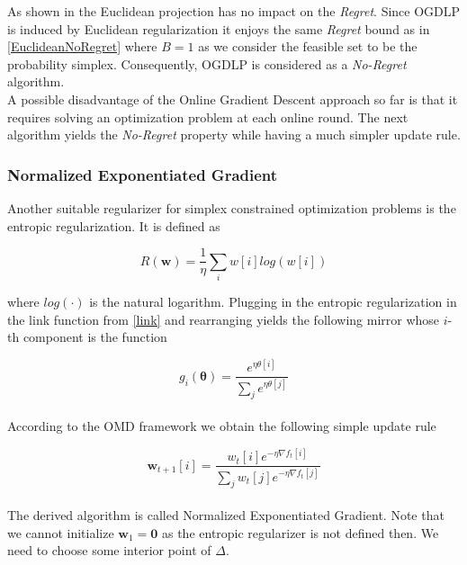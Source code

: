 As shown in \cite[Cor. 2.17]{shalev} the Euclidean projection has no impact on the \textit{Regret}. Since OGDLP is induced by Euclidean regularization it enjoys the same \textit{Regret} bound as in \ref{EuclideanNoRegret} where $B = 1$ as we consider the feasible set to be the probability simplex. Consequently, OGDLP is considered as a \textit{No-Regret} algorithm. \\

A possible disadvantage of the Online Gradient Descent approach so far is that it requires solving an optimization problem at each online round. The next algorithm yields the \textit{No-Regret} property while having a much simpler update rule.


\subsubsection{Normalized Exponentiated Gradient}\label{subsubsection:normalizedExponentiatedGradient}

Another suitable regularizer for simplex constrained optimization problems is the entropic regularization. It is defined as 

\begin{equation}\label{entropicReg}
    R(\textbf{w}) = \frac{1}{\eta} \sum_{i}w[i]log(w[i])
\end{equation}

where $log(\cdot)$ is the natural logarithm. Plugging in the entropic regularization in the link function from \ref{link} and rearranging yields the following mirror whose $i$-th component is the function \cite{shalev}

\begin{equation*}
    g_i(\boldsymbol{\theta}) = \frac{e^{\eta\theta[i]}}{\sum_{j}e^{\eta\theta[j]}}
\end{equation*} \\

According to the OMD framework we obtain the following simple update rule \cite{shalev}

\begin{equation*}
    \textbf{w}_{t+1}[i] = \frac{w_t[i]e^{-\eta\nabla f_t[i]}}{\sum_{j}w_t[j]e^{-\eta\nabla f_t[j]}}
\end{equation*} \\

The derived algorithm is called Normalized Exponentiated Gradient. Note that we cannot initialize $\textbf{w}_1 = \textbf{0}$ as the entropic regularizer is not defined then. We need to choose some interior point of $\Delta$. \\


